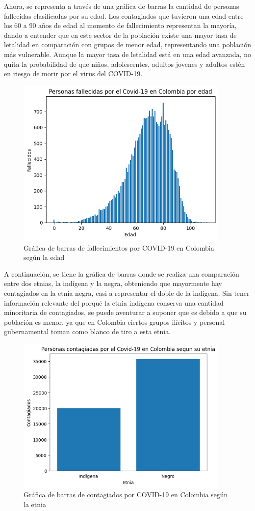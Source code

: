 \documentclass[conference,compsoc,onecolumn]{IEEEtran}
\begin{document}
Ahora, se representa a través de una gráfica de barras la cantidad de personas fallecidas clasificadas por su edad. Los contagiados que tuvieron una edad entre los 60 a 90 años de edad al momento de fallecimiento representan la mayoría, dando a entender que en este sector de la población existe una mayor tasa de letalidad en comparación con grupos de menor edad, representando una población más vulnerable. Aunque la mayor tasa de letalidad está en una edad avanzada, no quita la probabilidad de que niños, adolescentes, adultos jovenes y adultos estén en riesgo de morir por el virus del COVID-19.  \\
\begin{figure}[H]
\centering
\includegraphics[width=10.5cm]{./images/GraficoBarras_Edad_Fallecidos.png}
\caption{Gráfica de barras de fallecimientos por COVID-19 en Colombia según la edad}
\label{fig:mesh1}
\end{figure}

A continuación, se tiene la gráfica de barras donde se realiza una comparación entre dos etnias, la indígena y la negra, obteniendo que mayormente hay contagiados en la etnia negra, casi a representar el doble de la indígena. Sin tener información relevante del porqué la etnia indígena conserva una cantidad minoritaria de contagiados, se puede aventurar a suponer que es debido a que su población es menor, ya que en Colombia ciertos grupos ilícitos y personal gubernamental toman como blanco de tiro a esta etnia.
\begin{figure}[H]
\centering
\includegraphics[width=10.5cm]{./images/GraficoBarras_Etnia_Contagios.png}
\caption{Gráfica de barras de contagiados por COVID-19 en Colombia según la etnia}
\label{fig:mesh1}
\end{figure}
\end{document}

